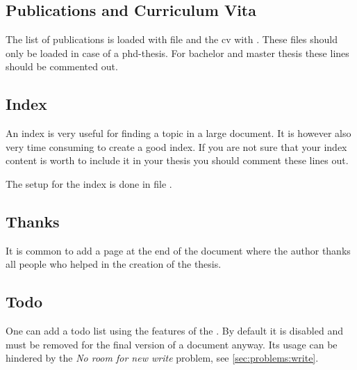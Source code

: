 \subsection{Publications and Curriculum Vita}
\label{sec:document:cv}

The list of publications is loaded with file  and the cv with . These files should only be loaded in case of a phd-thesis. For bachelor and master thesis these lines should be commented out.
%


\subsection{Index}
\label{sec:document:index}

An index is very useful for finding a topic in a large document. It is however also very time consuming to create a good index. If you are not sure that your index content is worth to include it in your thesis you should comment these lines out.

The setup for the index is done in file .


\subsection{Thanks}
\label{sec:document:thanks}

It is common to add a page at the end of the document where the author thanks all people who helped in the creation of the thesis. 


\subsection{Todo}
\label{sec:document:todo}

One can add a todo list using the features of the . 
By default it is disabled and must be removed for the final version of a document anyway. Its usage can be hindered by the \textit{No room for new write} problem, see \cref{sec:problems:write}.

